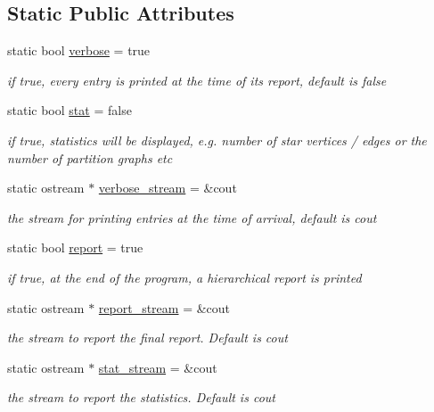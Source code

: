 \subsection*{Static Public Attributes}
\begin{DoxyCompactItemize}
\item 
static bool \hyperlink{classlogger_aab3c778c044ddf4b1b5fad8f4c230ff9}{verbose} = true
\begin{DoxyCompactList}\small\item\em if true, every entry is printed at the time of its report, default is false \end{DoxyCompactList}\item 
static bool \hyperlink{classlogger_a26812b5ba03f130e8dae3446d5fc032f}{stat} = false
\begin{DoxyCompactList}\small\item\em if true, statistics will be displayed, e.\+g. number of star vertices / edges or the number of partition graphs etc \end{DoxyCompactList}\item 
static ostream $\ast$ \hyperlink{classlogger_ae8d04646d8d5244120781025a4d8540b}{verbose\+\_\+stream} = \&cout
\begin{DoxyCompactList}\small\item\em the stream for printing entries at the time of arrival, default is cout \end{DoxyCompactList}\item 
static bool \hyperlink{classlogger_adbcc380b0ef53e23125f91e1c8f13f4e}{report} = true
\begin{DoxyCompactList}\small\item\em if true, at the end of the program, a hierarchical report is printed \end{DoxyCompactList}\item 
static ostream $\ast$ \hyperlink{classlogger_a8e3da449edb99f9ecc59858c0e75beca}{report\+\_\+stream} = \&cout
\begin{DoxyCompactList}\small\item\em the stream to report the final report. Default is cout \end{DoxyCompactList}\item 
static ostream $\ast$ \hyperlink{classlogger_a7db37821f875f2ba3540980b355779f5}{stat\+\_\+stream} = \&cout
\begin{DoxyCompactList}\small\item\em the stream to report the statistics. Default is cout \end{DoxyCompactList}\item 

\end{DoxyCompactItemize}
